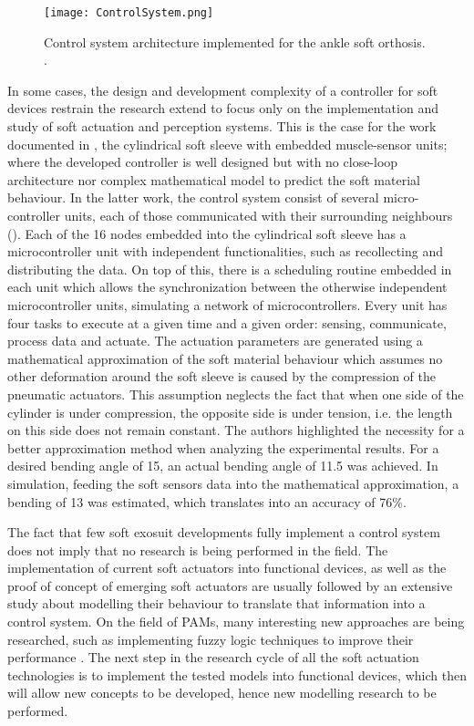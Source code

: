 \begin{figure}[hbtp!]
    \centering
    \texttt{[image: ControlSystem.png]}
    \caption{Control system architecture implemented for the ankle soft orthosis. \cite{park2011bio}. }
    \label{fig:control_system}
\end{figure}

In some cases, the design and development complexity of a controller for soft devices restrain the research extend to focus only on the implementation and study of soft actuation and perception systems. This is the case for the work documented in \cite{Park2012}, the cylindrical soft sleeve with embedded muscle-sensor units; where the developed controller is well designed but with no close-loop architecture nor complex mathematical model to predict the soft material behaviour. In the latter work, the control system consist of several micro-controller units, each of those communicated with their surrounding neighbours (). Each of the 16 nodes embedded into the cylindrical soft sleeve has a microcontroller unit with independent functionalities, such as recollecting and distributing the data. On top of this, there is a scheduling routine embedded in each unit which allows the synchronization between the otherwise independent microcontroller units, simulating a network of microcontrollers. Every unit has four tasks to execute at a given time and a given order: sensing, communicate, process data and actuate. The actuation parameters are generated using a mathematical approximation of the soft material behaviour which assumes no other deformation around the soft sleeve is caused by the compression of the pneumatic actuators. This assumption neglects the fact that when one side of the cylinder is under compression, the opposite side is under tension, i.e. the length on this side does not remain constant. The authors highlighted the necessity for a better approximation method when analyzing the experimental results. For a desired bending angle of 15\textdegree{}, an actual bending angle of 11.5\textdegree{} was achieved. In simulation, feeding the soft sensors data into the mathematical approximation, a bending of 13\textdegree{} was estimated, which translates into an accuracy of 76\%.

The fact that few soft exosuit developments fully implement a control system does not imply that no research is being performed in the field. The implementation of current soft actuators into functional devices, as well as the proof of concept of emerging soft actuators are usually followed by an extensive study about modelling their behaviour to translate that information into a control system. On the field of PAMs, many interesting new approaches are being researched, such as implementing fuzzy logic techniques to improve their performance \cite{Chang2015,Skorina2015,Bishop-Moser2015,Hosovsky2016}. The next step in the research cycle of all the soft actuation technologies is to implement the tested models into functional devices, which then will allow new concepts to be developed, hence new modelling research to be performed.

